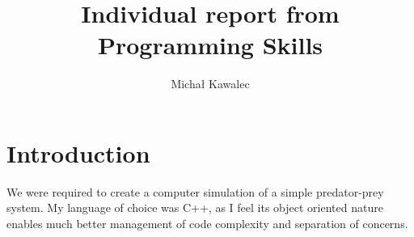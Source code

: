 \documentclass[11pt,a4paper]{article}
\begin{document}
\title{Individual report from Programming Skills}
\author{Michał Kawalec}
\maketitle

\section{Introduction}
We were required to create a computer simulation of a simple predator-prey system.
My language of choice was C++, as I feel its object oriented nature enables much better management of code complexity and separation of concerns.
\end{document}

